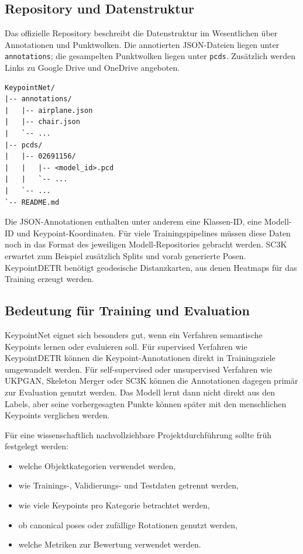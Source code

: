 \documentclass[11pt,a4paper]{article}
\begin{document}
\subsection{Repository und Datenstruktur}

Das offizielle Repository beschreibt die Datenstruktur im Wesentlichen über Annotationen und Punktwolken. Die annotierten JSON-Dateien liegen unter \texttt{annotations}; die gesampelten Punktwolken liegen unter \texttt{pcds}. Zusätzlich werden Links zu Google Drive und OneDrive angeboten.

\begin{lstlisting}
KeypointNet/
|-- annotations/
|   |-- airplane.json
|   |-- chair.json
|   `-- ...
|-- pcds/
|   |-- 02691156/
|   |   |-- <model_id>.pcd
|   |   `-- ...
|   `-- ...
`-- README.md
\end{lstlisting}

Die JSON-Annotationen enthalten unter anderem eine Klassen-ID, eine Modell-ID und Keypoint-Koordinaten. Für viele Trainingspipelines müssen diese Daten noch in das Format des jeweiligen Modell-Repositories gebracht werden. SC3K erwartet zum Beispiel zusätzlich Splits und vorab generierte Posen. KeypointDETR benötigt geodesische Distanzkarten, aus denen Heatmaps für das Training erzeugt werden.

\subsection{Bedeutung für Training und Evaluation}

KeypointNet eignet sich besonders gut, wenn ein Verfahren semantische Keypoints lernen oder evaluieren soll. Für supervised Verfahren wie KeypointDETR können die Keypoint-Annotationen direkt in Trainingsziele umgewandelt werden. Für self-supervised oder unsupervised Verfahren wie UKPGAN, Skeleton Merger oder SC3K können die Annotationen dagegen primär zur Evaluation genutzt werden. Das Modell lernt dann nicht direkt aus den Labels, aber seine vorhergesagten Punkte können später mit den menschlichen Keypoints verglichen werden.

Für eine wissenschaftlich nachvollziehbare Projektdurchführung sollte früh festgelegt werden:

\begin{itemize}
    \item welche Objektkategorien verwendet werden,
    \item wie Trainings-, Validierungs- und Testdaten getrennt werden,
    \item wie viele Keypoints pro Kategorie betrachtet werden,
    \item ob canonical poses oder zufällige Rotationen genutzt werden,
    \item welche Metriken zur Bewertung verwendet werden.
\end{itemize}
\end{document}
